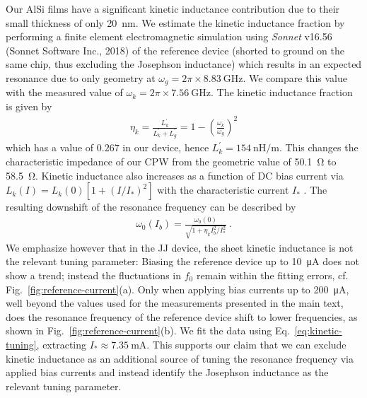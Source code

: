 % 
Our AlSi films have a significant kinetic inductance contribution due to their small thickness of only \SI{20}{nm}.
% 
We estimate the kinetic inductance fraction by performing a finite element electromagnetic simulation using \textit{Sonnet} v16.56 (Sonnet Software Inc., 2018) of the reference device (shorted to ground on the same chip, thus excluding the Josephson inductance) which results in an expected resonance due to only geometry at $\omega_{g}=2\pi\times\SI{8.83}{\giga\hertz}$.
% 
We compare this value with the measured value of $\omega_{k}=2\pi\times\SI{7.56}{\giga\hertz}$.
% 
The kinetic inductance fraction is given by~\cite{gaoExperimentalStudyKinetic2006}
% 
\begin{align}
\eta_k = \frac{L_k^\prime}{L_k^\prime+L_g^\prime}=1-\left(\frac{\omega_k}{\omega_g}\right)^2
\end{align}
% 
which has a value of $0.267$ in our device, hence $L_k^\prime=\SI{154}{\nano\henry\per\meter}$.
%
This changes the characteristic impedance of our CPW from the geometric value of \SI{50.1}{\ohm} to \SI{58.5}{\ohm}.
% 
Kinetic inductance also increases as a function of DC bias current via $L_k(I)=L_k(0)\left[1+(I/I_*)^2\right]$ with the characteristic current $I_*$ \cite{annunziataTunableSuperconductingNanoinductors2010b}.
% 
The resulting downshift of the resonance frequency can be described by
% 
\begin{align}
\omega_0(I_b) = \frac{\omega_0(0)}{\sqrt{1+\eta_kI_b^2/I_*^{2}}} \ .
\label{eq:kinetic-tuning}
\end{align}
% 
We emphasize however that in the JJ device, the sheet kinetic inductance is not the relevant tuning parameter:
% 
Biasing the reference device up to \SI{10}{\micro\ampere} does not show a trend; instead the fluctuations in $f_0$ remain within the fitting errors, cf.  Fig.~\ref{fig:reference-current}(a).
% 
Only when applying bias currents up to \SI{200}{\micro\ampere}, well beyond the values used for the measurements presented in the main text, does the resonance frequency of the reference device shift to lower frequencies, as shown in Fig.~\ref{fig:reference-current}(b).
% 
We fit the data using Eq.~\eqref{eq:kinetic-tuning}, extracting $I_*\approx\SI{7.35}{\milli\ampere}$.
% 
This supports our claim that we can exclude kinetic inductance as an additional source of tuning the resonance frequency via applied bias currents and instead identify the Josephson inductance as the relevant tuning parameter.


